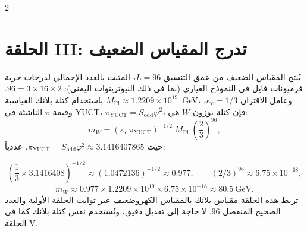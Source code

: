 \documentclass[12pt,a4paper]{article}
\begin{document}
\begin{multicols}{2}
		\section{الحلقة III: تدرج المقياس الضعيف}
		
		يُنتج المقياس الضعيف من عمق التنسيق \(L = 96\)، المثبت بالعدد الإجمالي لدرجات حرية فرميونات فايل في النموذج العياري (بما في ذلك النيوترينوات اليمنى): \(96 = 3 \times 16 \times 2\). باستخدام كتلة بلانك القياسية \(M_{\mathrm{Pl}} \approx 1.2209 \times 10^{19}\)~GeV، وعامل الاقتران \(\kappa_c = 1/3\)، وقيمة \(\pi\) الناشئة في YUCT، \(\pi_{\mathrm{YUCT}} = S_{\mathrm{odd}}\varphi^2\)، فإن كتلة بوزون \(W\) هي:
		\begin{equation}
			\boxed{m_W = \left( \kappa_c \, \pi_{\mathrm{YUCT}} \right)^{-1/2} \; M_{\mathrm{Pl}} \; \left( \frac{2}{3} \right)^{96}},
		\end{equation}
		حيث \(\pi_{\mathrm{YUCT}} = S_{\mathrm{odd}}\varphi^2 \approx 3.1416407865\). عددياً:
	\end{multicols}
	\small
	\[
	\left( \frac{1}{3} \times 3.1416408 \right)^{-1/2} \approx (1.0472136)^{-1/2} \approx 0.977,\qquad 
	(2/3)^{96} \approx 6.75 \times 10^{-18},
	\]
	\[
	m_W \approx 0.977 \times 1.2209 \times 10^{19} \times 6.75 \times 10^{-18} \approx 80.5\ \text{GeV}.
	\]
	تربط هذه الحلقة مقياس بلانك بالمقياس الكهروضعيف عبر ثوابت الحلقة الأولية والعدد الصحيح المنفصل \(96\). لا حاجة إلى تعديل دقيق، وتُستخدم نفس كتلة بلانك كما في الحلقة V.
\end{document}

